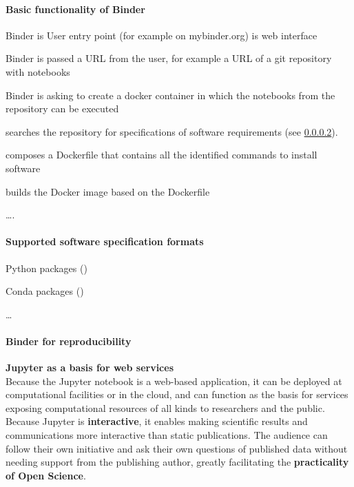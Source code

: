 \paragraph{Basic functionality of Binder}
\label{binder-how-does-it-work}

\begin{compactitem}
\item Binder is  User entry point (for example on mybinder.org) is web interface 
\item Binder is passed a URL from the user, for example a URL of a git repository with notebooks
\item Binder is asking \repotodocker{} to create a docker container in which the notebooks from the repository can be executed
\item \repotodocker{} searches the repository for specifications of software requirements (see \ref{repo2docker-supported-software-specifications}).
\item \repotodocker{} composes a Dockerfile that contains all the identified commands to install software
\item \repotodocker{} builds the Docker image based on the Dockerfile
\item \ldots {}.
\end{compactitem}


\paragraph{Supported software specification formats}
\label{repo2docker-supported-software-specifications}
\begin{compactitem}
\item Python packages ()
\item Conda packages ()
\item \ldots
\end{compactitem}

\TOWRITE{}{}

\medskip
\paragraph{Binder for reproducibility}
\TOWRITE{}{}

\medskip
\noindent\textbf{Jupyter as a basis for web services}\\
Because the Jupyter notebook is a web-based application, it can be
deployed at computational facilities or in the cloud, and can function
as the basis for services exposing computational resources of all
kinds to researchers and the public.  Because Jupyter is
\textbf{interactive}, it enables making scientific results and
communications more interactive than static publications.  The
audience can follow their own initiative and ask their own questions
of published data without needing support from the publishing author,
greatly facilitating the \textbf{practicality of Open Science}.

